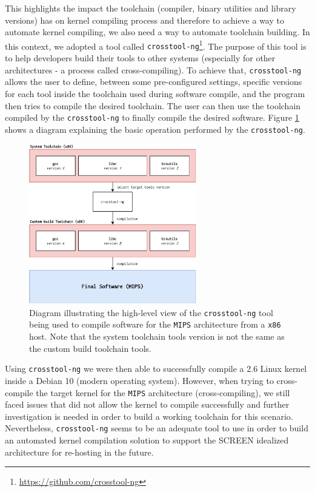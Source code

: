 This highlights the impact the toolchain (compiler, binary utilities and library versions) has on kernel compiling process and therefore to achieve a way to automate kernel compiling, we also need a way to automate toolchain building. In this context, we adopted a tool called {\tt crosstool-ng}\footnote{\url{https://github.com/crosstool-ng}}. The purpose of this tool is to help developers build their tools to other systems (especially for other architectures - a process called cross-compiling). To achieve that, {\tt crosstool-ng} allows the user to define, between some pre-configured settings, specific versions for each tool inside the toolchain used during software compile, and the program then tries to compile the desired toolchain. The user can then use the toolchain compiled by the {\tt crosstool-ng} to finally compile the desired software. Figure \ref{fig:crosstool} shows a diagram explaining the basic operation performed by the {\tt crosstool-ng}.

\begin{figure}[H]
    \centering
    \includegraphics[width=0.65\textwidth]{figs/crosstool.pdf}
    \caption{Diagram illustrating the high-level view of the {\tt crosstool-ng} tool being used to compile software for the {\tt MIPS} architecture from a {\tt x86} host. Note that the system toolchain tools version is not the same as the custom build toolchain tools.}
    \label{fig:crosstool}
\end{figure}

Using {\tt crosstool-ng} we were then able to successfully compile a 2.6 Linux kernel inside a Debian 10 (modern operating system). However, when trying to cross-compile the target kernel for the {\tt MIPS} architecture (cross-compiling), we still faced issues that did not allow the kernel to compile successfully and further investigation is needed in order to build a working toolchain for this scenario. Nevertheless, {\tt crosstool-ng} seems to be an adequate tool to use in order to build an automated kernel compilation solution to support the SCREEN idealized architecture for re-hosting in the future.

